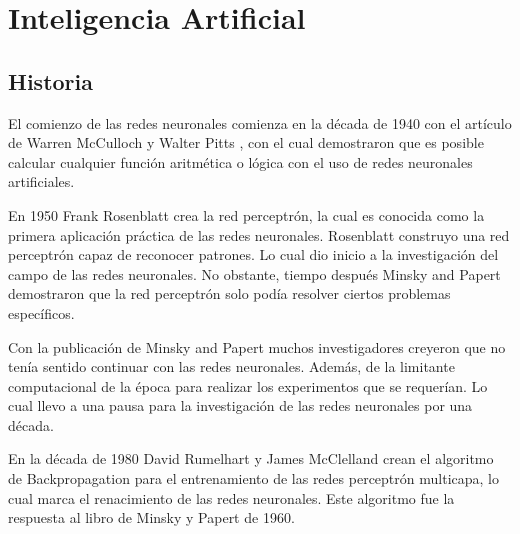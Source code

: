 \section{Inteligencia Artificial}

\subsection{Historia}

El comienzo de las redes neuronales comienza en la década de 1940 con el artículo de Warren McCulloch y Walter Pitts \cite{mcculloch1943Logical}, con el cual demostraron que es posible calcular cualquier función aritmética o lógica con el uso de redes neuronales artificiales.

En 1950 Frank Rosenblatt \cite{rosenblatt1958Perceptron} crea la red perceptrón, la cual es conocida como la primera aplicación práctica de las redes neuronales. Rosenblatt construyo una red perceptrón capaz de reconocer patrones. Lo cual dio inicio a la investigación del campo de las redes neuronales. No obstante, tiempo después Minsky and Papert \cite{minsky1969Perceptrons} demostraron que la red perceptrón solo podía resolver ciertos problemas específicos.

Con la publicación de Minsky and Papert muchos investigadores creyeron que no tenía sentido continuar con las redes neuronales. Además, de la limitante computacional de la época para realizar los experimentos que se requerían. Lo cual llevo a una pausa para la investigación de las redes neuronales por una década.

En la década de 1980 David Rumelhart y James McClelland \cite{rumelhart1986Parallel} crean el algoritmo de Backpropagation para el entrenamiento de las redes perceptrón multicapa, lo cual marca el renacimiento de las redes neuronales. Este algoritmo fue la respuesta al libro de Minsky y Papert de 1960.
